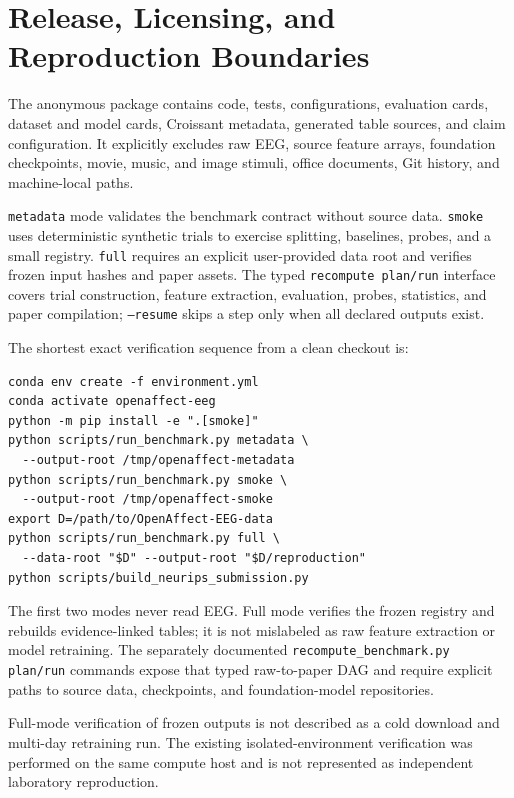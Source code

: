 \section{Release, Licensing, and Reproduction Boundaries}

The anonymous package contains code, tests, configurations, evaluation cards,
dataset and model cards, Croissant metadata, generated table sources, and claim
configuration. It explicitly excludes raw EEG, source feature arrays,
foundation checkpoints, movie, music, and image stimuli, office documents, Git
history, and machine-local paths.

\texttt{metadata} mode validates the benchmark contract without source data.
\texttt{smoke} uses deterministic synthetic trials to exercise splitting,
baselines, probes, and a small registry. \texttt{full} requires an explicit
user-provided data root and verifies frozen input hashes and paper assets. The
typed \texttt{recompute plan/run} interface covers trial construction, feature
extraction, evaluation, probes, statistics, and paper compilation;
\texttt{--resume} skips a step only when all declared outputs exist.

The shortest exact verification sequence from a clean checkout is:
\begin{small}
\begin{verbatim}
conda env create -f environment.yml
conda activate openaffect-eeg
python -m pip install -e ".[smoke]"
python scripts/run_benchmark.py metadata \
  --output-root /tmp/openaffect-metadata
python scripts/run_benchmark.py smoke \
  --output-root /tmp/openaffect-smoke
export D=/path/to/OpenAffect-EEG-data
python scripts/run_benchmark.py full \
  --data-root "$D" --output-root "$D/reproduction"
python scripts/build_neurips_submission.py
\end{verbatim}
\end{small}
The first two modes never read EEG. Full mode verifies the frozen registry and
rebuilds evidence-linked tables; it is not mislabeled as raw feature extraction
or model retraining. The separately documented \texttt{recompute\_benchmark.py
plan/run} commands expose that typed raw-to-paper DAG and require explicit paths
to source data, checkpoints, and foundation-model repositories.

Full-mode verification of frozen outputs is not described as a cold download
and multi-day retraining run. The existing isolated-environment verification
was performed on the same compute host and is not represented as independent
laboratory reproduction.

